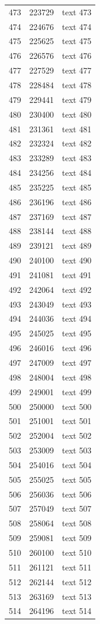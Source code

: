 \documentclass[10pt]{article}
\begin{document}
\begin{longtable}{rrl}
473&223729&text 473\\
474&224676&text 474\\
475&225625&text 475\\
476&226576&text 476\\
477&227529&text 477\\
478&228484&text 478\\
479&229441&text 479\\
480&230400&text 480\\
481&231361&text 481\\
482&232324&text 482\\
483&233289&text 483\\
484&234256&text 484\\
485&235225&text 485\\
486&236196&text 486\\
487&237169&text 487\\
488&238144&text 488\\
489&239121&text 489\\
490&240100&text 490\\
491&241081&text 491\\
492&242064&text 492\\
493&243049&text 493\\
494&244036&text 494\\
495&245025&text 495\\
496&246016&text 496\\
497&247009&text 497\\
498&248004&text 498\\
499&249001&text 499\\
500&250000&text 500\\
501&251001&text 501\\
502&252004&text 502\\
503&253009&text 503\\
504&254016&text 504\\
505&255025&text 505\\
506&256036&text 506\\
507&257049&text 507\\
508&258064&text 508\\
509&259081&text 509\\
510&260100&text 510\\
511&261121&text 511\\
512&262144&text 512\\
513&263169&text 513\\
514&264196&text 514\\

\end{longtable}
\end{document}
